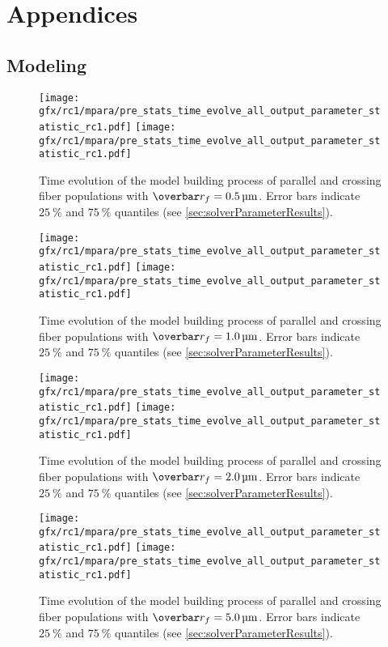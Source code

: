 \newpage\null\thispagestyle{empty}\newpage
\clearpage{\thispagestyle{empty}\cleardoublepage}
\part{Appendices}
%
\chapter{Modeling}
\label{app:modelAnalysis}
%
\setlength{\tikzwidth}{\textwidth}
\begin{sidewaysfigure}[!p]
    \centering
    \texttt{[image: gfx/rc1/mpara/pre\_stats\_time\_evolve\_all\_output\_parameter\_statistic\_rc1.pdf]}
    \texttt{[image: gfx/rc1/mpara/pre\_stats\_time\_evolve\_all\_output\_parameter\_statistic\_rc1.pdf]}
    \label{app:pste1}
    \caption[]{Time evolution of the model building process of parallel and crossing fiber populations with $\fiberRadiusMean=\SI{0.5}{\micro\meter}$. Error bars indicate $\SI{25}{\percent}$ and $\SI{75}{\percent}$ quantiles (see \cref{sec:solverParameterResults}).}
\end{sidewaysfigure}
%
\begin{sidewaysfigure}[!p]
    \centering
    \texttt{[image: gfx/rc1/mpara/pre\_stats\_time\_evolve\_all\_output\_parameter\_statistic\_rc1.pdf]}
    \texttt{[image: gfx/rc1/mpara/pre\_stats\_time\_evolve\_all\_output\_parameter\_statistic\_rc1.pdf]}
    \label{app:pste2}
    \caption[]{Time evolution of the model building process of parallel and crossing fiber populations with $\fiberRadiusMean=\SI{1.0}{\micro\meter}$. Error bars indicate $\SI{25}{\percent}$ and $\SI{75}{\percent}$ quantiles (see \cref{sec:solverParameterResults}).}
\end{sidewaysfigure}
%
\begin{sidewaysfigure}[!p]
    \centering
    \texttt{[image: gfx/rc1/mpara/pre\_stats\_time\_evolve\_all\_output\_parameter\_statistic\_rc1.pdf]}
    \texttt{[image: gfx/rc1/mpara/pre\_stats\_time\_evolve\_all\_output\_parameter\_statistic\_rc1.pdf]}
    \label{app:pste3}
    \caption[]{Time evolution of the model building process of parallel and crossing fiber populations with $\fiberRadiusMean=\SI{2.0}{\micro\meter}$. Error bars indicate $\SI{25}{\percent}$ and $\SI{75}{\percent}$ quantiles (see \cref{sec:solverParameterResults}).}
\end{sidewaysfigure}
%
\begin{sidewaysfigure}[!p]
    \centering
    \texttt{[image: gfx/rc1/mpara/pre\_stats\_time\_evolve\_all\_output\_parameter\_statistic\_rc1.pdf]}
    \texttt{[image: gfx/rc1/mpara/pre\_stats\_time\_evolve\_all\_output\_parameter\_statistic\_rc1.pdf]}
    \label{app:pste4}
    \caption[]{Time evolution of the model building process of parallel and crossing fiber populations with $\fiberRadiusMean=\SI{5.0}{\micro\meter}$. Error bars indicate $\SI{25}{\percent}$ and $\SI{75}{\percent}$ quantiles (see \cref{sec:solverParameterResults}).}
\end{sidewaysfigure}
